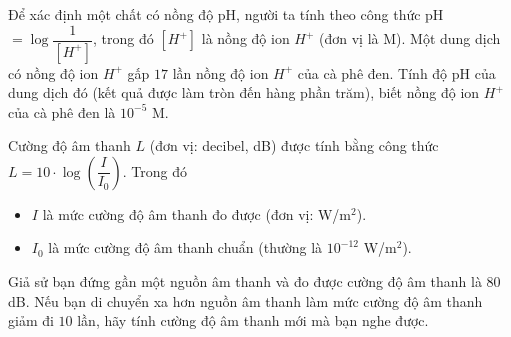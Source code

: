 \begin{bt}%

	Để xác định một chất có nồng độ pH, người ta tính theo công thức pH$=\log\dfrac{1}{\left[H^+\right]}$, trong đó $\left[H^+\right]$ là nồng độ ion $H^+$ (đơn vị là M). Một dung dịch có nồng độ ion $H^+$ gấp $17$ lần nồng độ ion $H^+$ của cà phê đen. Tính độ pH của dung dịch đó (kết quả được làm tròn đến hàng phần trăm), biết nồng độ ion $H^+$ của cà phê đen là $10^{-5}$ M.
\end{bt}

\begin{bt}%
	Cường độ âm thanh $L$ (đơn vị: decibel, dB) được tính bằng công thức \break $L=10\cdot\log\left(\dfrac{I}{I_0}\right)$.	Trong đó
	\begin{itemize}
		\item $I$ là mức cường độ âm thanh đo được (đơn vị: W/m$^2$).
		\item $I_0$ là mức cường độ âm thanh chuẩn (thường là $10^{-12}$ W/m$^2$).
	\end{itemize}
	Giả sử bạn đứng gần một nguồn âm thanh và đo được cường độ âm thanh là $80$ dB. Nếu bạn di chuyển xa hơn nguồn âm thanh làm mức cường độ âm thanh giảm đi $10$ lần, hãy tính cường độ âm thanh mới mà bạn nghe được.
\end{bt}

